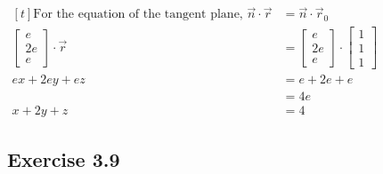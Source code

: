 $\begin{aligned}[t]
    \text{For the equation of the tangent plane, }
    \vec{n} \cdot \vec{r}
     & = \vec{n} \cdot \vec{r}_0                                                                    \\
    \begin{bmatrix} e \\ 2e \\ e \end{bmatrix} \cdot \vec{r}
     & = \begin{bmatrix} e \\ 2e \\ e \end{bmatrix} \cdot \begin{bmatrix} 1 \\ 1 \\ 1 \end{bmatrix} \\
    ex + 2ey + ez
     & = e + 2e + e                                                                                 \\
     & = 4e                                                                                         \\
    x + 2y + z
     & = 4
\end{aligned}$

\subsection*{Exercise 3.9}

